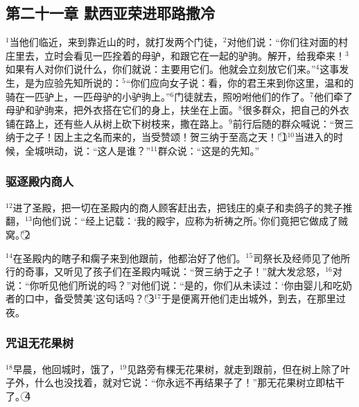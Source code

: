 \subsection{第二十一章 默西亚荣进耶路撒冷}
$^{1}$当他们临近\UL[耶路撒冷]，来到靠近\UL[橄榄]山的\UL[贝特法革]时，\UL[耶稣]就打发两个门徒，$^{2}$对他们说：“你们往对面的村庄里去，立时会看见一匹拴着的母驴，和跟它在一起的驴驹。解开，给我牵来！$^{3}$如果有人对你们说什么，你们就说：主要用它们。他就会立刻放它们来。”$^{4}$这事发生，是为应验先知所说的：$^{5}$“你们应向\UL[熙雍]女子说：看，你的君王来到你这里，温和的骑在一匹驴上，一匹母驴的小驴驹上。”$^{6}$门徒就去，照\UL[耶稣]吩咐他们的作了。$^{7}$他们牵了母驴和驴驹来，把外衣搭在它们的身上，扶\UL[耶稣]坐在上面。$^{8}$很多群众，把自己的外衣铺在路上，还有些人从树上砍下树枝来，撒在路上。$^{9}$前行后随的群众喊说：“贺三纳于\UL[达味]之子！因上主之名而来的，当受赞颂！贺三纳于至高之天！”\textcircled{1}$^{10}$当\UL[耶稣]进入\UL[耶路撒冷]的时候，全城哄动，说：“这人是谁？”$^{11}$群众说：“这是\UL[加里肋亚]\UL[纳匝肋]的先知\UL[耶稣]。”


\subsubsection{驱逐殿内商人}
$^{12}$\UL[耶稣]进了圣殿，把一切在圣殿内的商人顾客赶出去，把钱庄的桌子和卖鸽子的凳子推翻，$^{13}$向他们说：“经上记载：‘我的殿宇，应称为祈祷之所。’你们竟把它做成了贼窝。”\textcircled{2}

$^{14}$在圣殿内的瞎子和瘸子来到他跟前，他都治好了他们。$^{15}$司祭长及经师见了他所行的奇事，又听见了孩子们在圣殿内喊说：“贺三纳于\UL[达味]之子！”就大发忿怒，$^{16}$对\UL[耶稣]说：“你听见他们所说的吗？”\UL[耶稣]对他们说：“是的，你们从未读过：‘你由婴儿和吃奶者的口中，备受赞美’这句话吗？”\textcircled{3}$^{17}$于是便离开他们走出城外，到\UL[伯达尼]去，在那里过夜。


\subsubsection{咒诅无花果树}
$^{18}$早晨，他回城时，饿了，$^{19}$见路旁有棵无花果树，就走到跟前，但在树上除了叶子外，什么也没找着，就对它说：“你永远不再结果子了！”那无花果树立即枯干了。\textcircled{4}

